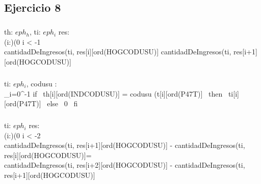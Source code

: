 \documentclass[a4paper]{article}
\begin{document}
\subparagraph{}

\subparagraph{}

\subparagraph{}

\subsection{Ejercicio 8}
\subparagraph{}
	{\In th: $eph_{h}$, \In ti: $eph_{i}$ \In res:  }{ \\\indent\indent\indent 
	(\forall i:\ent)(0 \leq i < -1 \implicaLuego
	\\\indent\indent\indent
	cantidadDeIngresos(ti, res[i][ord(HOGCODUSU)] \leq 
	cantidadDeIngresos(ti, res[i+1][ord(HOGCODUSU)]\\
\indent\indent}

\subparagraph{}
	{\In ti: $eph_{i}$, \In codusu : \ent}{\ent}{\\\indent\indent\indent
	\sum_{i=0}^{-1} if \, th[i][ord(INDCODUSU)] = codusu \wedge (t[i][ord(P47T)]  \, then \, ti[i][ord(P47T)] \, else \, 0 \, fi 
}

\subparagraph{}
	{\In ti: $eph_{i}$ \In res: }{\\\indent\indent\indent
	(\forall i:\ent)(0 \leq i < -2 \implicaLuego 
	\\\indent\indent\indent
	cantidadDeIngresos(ti, res[i+1][ord(HOGCODUSU)] - cantidadDeIngresos(ti, res[i][ord(HOGCODUSU)]= 
	\\\indent\indent\indent
	 cantidadDeIngresos(ti, res[i+2][ord(HOGCODUSU)] - cantidadDeIngresos(ti, res[i+1][ord(HOGCODUSU)] \\
\indent\indent}
\end{document}
